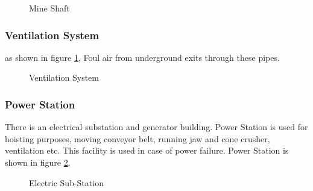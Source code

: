 \documentclass[12pt,a4paper]{article}
\begin{document}
\begin{figure}[ht]
\centering
{}
\caption{Mine Shaft}
\end{figure}

\subsubsection{Ventilation System}
as shown in figure \ref{ventilation}, Foul air from underground exits through these pipes.

\begin{figure}[t]
\centering
{}
\caption{Ventilation System}
\label{ventilation}
\end{figure}

\subsubsection{Power Station}
There is an electrical substation and generator building. Power Station is used for hoisting purposes, moving conveyor belt, running jaw and cone crusher, ventilation etc. This facility is used in case of power failure. Power Station is shown in figure \ref{powerstation}.

\begin{figure}[ht]
\centering
{}
\caption{Electric Sub-Station}
\label{powerstation}
\end{figure}
\end{document}
